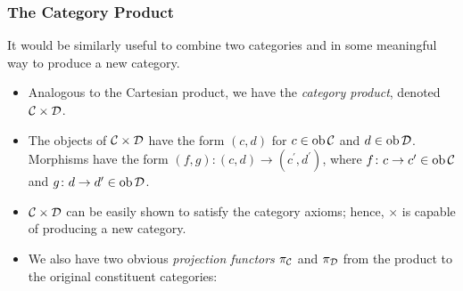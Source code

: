 \documentclass{beamer}
\numberwithin{figure}{section}
\DeclareMathOperator{\catobj}{ob}
\newcommand{\arbcat}[1]{\ensuremath\mathcal{#1}}
\begin{document}
\begin{frame}
        \frametitle{The Category Product}
        It would be similarly useful to combine two categories and in some
        meaningful way to produce a new category.
        \pause
        \begin{itemize}
                \item Analogous to the Cartesian product, we have the
                        \emph{category product}, denoted $\arbcat{C} \times
                        \arbcat{D}$.
                \item The objects of $\arbcat{C} \times \arbcat{D}$ have the
                        form $(c,d)$ for $c \in \catobj \arbcat{C}$ and $d \in
                        \catobj \arbcat{D}$. Morphisms have the form $(f,g)
                        \colon (c,d) \to (c^\prime,d^\prime)$, where
                        $f \colon c \to c^\prime \in \catobj \arbcat{C}$ and
                        $g \colon d \to d^\prime \in \catobj \arbcat{D}$.
                \item $\arbcat{C} \times \arbcat{D}$ can be easily shown to
                        satisfy the category axioms; hence, $\times$ is capable
                        of producing a new category.
                \item We also have two obvious \emph{projection functors}
                        $\pi_\arbcat{C}$ and $\pi_\arbcat{D}$ from the product
                        to the original constituent categories:

                        \vspace{1em}
                        \begin{figure}
                        \end{figure}
        \end{itemize}
\end{frame}
\end{document}
